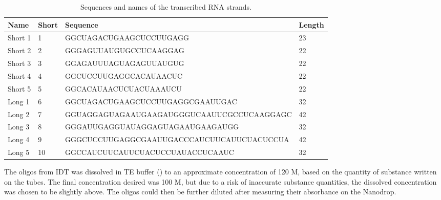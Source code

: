 \begin{table}
\begin{adjustbox}{width=\columnwidth}
\begin{tabular}{llll}
\hline
\textbf{Name}      & \textbf{Short} & \textbf{Sequence}                                           & \textbf{Length} \\
\hline
Short 1            & 1          & GGCUAGACUGAAGCUCCUUGAGG                    & 23     \\
Short 2            & 2          & GGGAGUUAUGUGCCUCAAGGAG                     & 22     \\
Short 3            & 3          & GGAGAUUUAGUAGAGUUAUGUG                     & 22     \\
Short 4            & 4          & GGCUCCUUGAGGCACAUAACUC                     & 22     \\
Short 5            & 5          & GGCACAUAACUCUACUAAAUCU                     & 22     \\
Long 1             & 6          & GGCUAGACUGAAGCUCCUUGAGGCGAAUUGAC           & 32     \\
Long 2             & 7          & GGUAGGAGUAGAAUGAAGAUGGGUCAAUUCGCCUCAAGGAGC & 42     \\
Long 3             & 8          & GGGAUUGAGGUAUAGGAGUAGAAUGAAGAUGG           & 32     \\
Long 4             & 9          & GGGCUCCUUGAGGCGAAUUGACCCAUCUUCAUUCUACUCCUA & 42     \\
Long 5             & 10         & GGCCAUCUUCAUUCUACUCCUAUACCUCAAUC           & 32     \\
\hline
\end{tabular}
\end{adjustbox}
\caption{Sequences and names of the transcribed RNA strands.}
\label{rna_strands}
\end{table}

The oligos from IDT was dissolved in TE buffer () to an approximate concentration of 120 \si{\micro}M, based on the quantity of substance written on the tubes. The final concentration desired was 100 \si{\micro}M, but due to a risk of inaccurate substance quantities, the dissolved concentration was chosen to be slightly above. The oligos could then be further diluted after measuring their absorbance on the Nanodrop.

